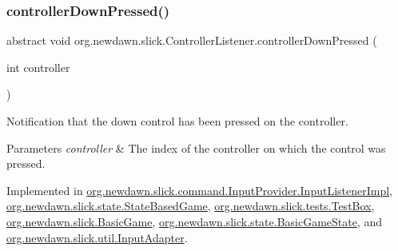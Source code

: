 \mbox{\label{interfaceorg_1_1newdawn_1_1slick_1_1_controller_listener_a9c619e7cb29b3c8b68bc24f9a4e238d7}} 
\subsubsection{\texorpdfstring{controller\+Down\+Pressed()}{controllerDownPressed()}}
{\footnotesize\ttfamily abstract void org.\+newdawn.\+slick.\+Controller\+Listener.\+controller\+Down\+Pressed (\begin{DoxyParamCaption}\item[{int}]{controller }\end{DoxyParamCaption})\hspace{0.3cm}{\ttfamily [abstract]}}

Notification that the down control has been pressed on the controller.


\begin{DoxyParams}{Parameters}
{\em controller} & The index of the controller on which the control was pressed. \\
\hline
\end{DoxyParams}


Implemented in \mbox{\hyperlink{classorg_1_1newdawn_1_1slick_1_1command_1_1_input_provider_1_1_input_listener_impl_a80dbef3f0eaed865ae1ef23b406cea40}{org.\+newdawn.\+slick.\+command.\+Input\+Provider.\+Input\+Listener\+Impl}}, \mbox{\hyperlink{classorg_1_1newdawn_1_1slick_1_1state_1_1_state_based_game_a3132de3950587a94bc059b40b5a7a703}{org.\+newdawn.\+slick.\+state.\+State\+Based\+Game}}, \mbox{\hyperlink{classorg_1_1newdawn_1_1slick_1_1tests_1_1_test_box_aa84a23e65a7987d83d2b555dce79076d}{org.\+newdawn.\+slick.\+tests.\+Test\+Box}}, \mbox{\hyperlink{classorg_1_1newdawn_1_1slick_1_1_basic_game_af4db3e5b864b3ee179de6935184727ac}{org.\+newdawn.\+slick.\+Basic\+Game}}, \mbox{\hyperlink{classorg_1_1newdawn_1_1slick_1_1state_1_1_basic_game_state_a8783d6be13e8d476cb035af5e740803a}{org.\+newdawn.\+slick.\+state.\+Basic\+Game\+State}}, and \mbox{\hyperlink{classorg_1_1newdawn_1_1slick_1_1util_1_1_input_adapter_af48b82447762dff2bc4b171d51468f1a}{org.\+newdawn.\+slick.\+util.\+Input\+Adapter}}.

